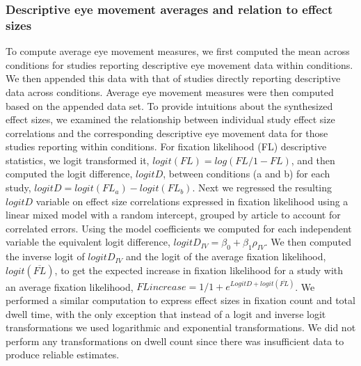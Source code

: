 \subsubsection{Descriptive eye movement averages and relation to effect sizes}
%
To compute average eye movement measures, we first computed the mean across conditions for studies reporting descriptive eye movement data within conditions. We then appended this data with that of studies directly reporting descriptive data across conditions. Average eye movement measures were then computed based on the appended data set. To provide intuitions about the synthesized effect sizes, we examined the relationship between individual study effect size correlations and the corresponding descriptive eye movement data for those studies reporting within conditions. For fixation likelihood (FL) descriptive statistics, we logit transformed it, $logit(FL) = log(FL/1 - FL)$, and then computed the logit difference, $logitD$, between conditions (a and b) for each study, $logitD = logit(FL_{a}) - logit(FL_{b})$. Next we regressed the resulting $logitD$ variable on effect size correlations expressed in fixation likelihood using a linear mixed model with a random intercept, grouped by article to account for correlated errors. Using the model coefficients we computed for each independent variable the equivalent logit difference, $logitD_{IV} = \beta_{0} + \beta_{1}\rho_{IV}$. We then computed the inverse logit of $logitD_{IV}$ and the logit of the average fixation likelihood, $logit(\overline{FL})$, to get the expected increase in fixation likelihood for a study with an average fixation likelihood, $FL increase = 1 / 1 + e^{LogitD + logit(\overline{FL})}$. We performed a similar computation to express effect sizes in fixation count and total dwell time, with the only exception that instead of a logit and inverse logit transformations we used logarithmic and exponential transformations. We did not perform any transformations on dwell count since there was insufficient data to produce reliable estimates.